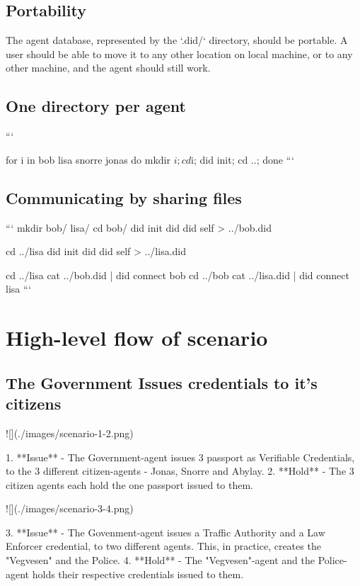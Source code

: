 \subsection{Portability}

The agent database, represented by the `.did/` directory, should be portable. A user should be able to move it to any other location on local machine, or to any other machine, and the agent should still work.


\subsection{One directory per agent}

```

for i in bob lisa snorre jonas
do
	mkdir $i;
	cd $i;
	did init;
	cd ..;
done
```

\subsection{Communicating by sharing files}

```
mkdir bob/ lisa/
cd bob/
did init
did did self > ../bob.did

cd ../lisa
did init
did did self > ../lisa.did

cd ../lisa
cat ../bob.did | did connect bob
cd ../bob
cat ../lisa.did | did connect lisa
```





\section{High-level flow of scenario}


\subsection{The Government Issues credentials to it's citizens}


![](./images/scenario-1-2.png)

1. **Issue** - The Government-agent issues 3 passport as Verifiable Credentials, to the 3 different citizen-agents - Jonas, Snorre and Abylay.
2. **Hold** - The 3 citizen agents each hold the one passport issued to them.


![](./images/scenario-3-4.png)

3. **Issue** - The Govenment-agent issues a Traffic Authority and a Law Enforcer credential, to two different agents. This, in practice, creates the "Vegvesen" and the Police.
4. **Hold** - The "Vegvesen"-agent and the Police-agent holds their respective credentials issued to them.


